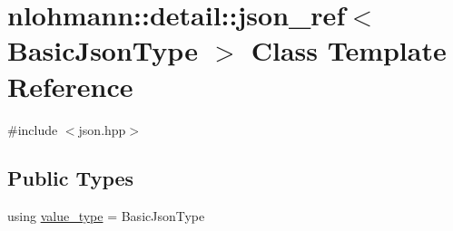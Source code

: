 \hypertarget{classnlohmann_1_1detail_1_1json__ref}{}\section{nlohmann\+::detail\+::json\+\_\+ref$<$ Basic\+Json\+Type $>$ Class Template Reference}
\label{classnlohmann_1_1detail_1_1json__ref}


{\ttfamily \#include $<$json.\+hpp$>$}

\subsection*{Public Types}
\begin{DoxyCompactItemize}
\item 
using \mbox{\hyperlink{classnlohmann_1_1detail_1_1json__ref_a78d76cf288141049568c0d670ed670ef}{value\+\_\+type}} = Basic\+Json\+Type
\end{DoxyCompactItemize}

